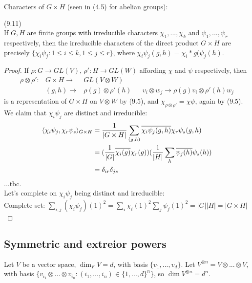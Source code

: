 \documentclass[a4paper]{article}
\begin{document}
Characters of $G \times H$ (seen in (4.5) for abelian groups):\\
\begin{prop} (9.11)\\
If $G,H$ are finite groups with irreducible characters $\chi_1,...,\chi_k$ and $\psi_1,...,\psi_r$ respectively, then the irreducible characters of the direct product $G \times H$ are precisely $\{\chi_i \psi_j:1 \leq i \leq k, 1 \leq j \leq r\}$, where $\chi_i \psi_j (g,h) = \chi_i*g( \psi_j(h)$.
\begin{proof}
If $\rho:G \to GL(V)$, $\rho':H \to GL(W)$ affording $\chi$ and $\psi$ respectively, then
\begin{equation*}
\begin{aligned}
\rho \otimes \rho': &G \times H \to &GL(V \otimes W)\\
&(g,h) \to &\rho(g) \otimes \rho'(h)
& &v_i \otimes w_j \to \rho(g) v_i \otimes \rho'(h) w_j
\end{aligned}
\end{equation*}
is a representation of $G \times H$ on $V \otimes W$ by (9.5), and $\chi_{\rho \otimes \rho'} = \chi\psi$, again by (9.5).\\
We claim that $\chi_i \psi_j$ are distinct and irreducible:
\begin{equation*}
\begin{aligned}
\langle \chi_i \psi_j,\chi_r\psi_s \rangle_{G \times H} &= \frac{1}{|G \times H|} \sum_{(g,h)} \overline{\chi_i\psi_j (g,h)} \chi_r \psi_s (g,h)\\
&= (\frac{1}{|G|} \overline{\chi_i(g)} \chi_r(g)) (\frac{1}{|H|} \sum_h \overline{\psi_j(h)} \psi_s(h))\\
&= \delta_{ir} \delta_{js}
\end{aligned}
\end{equation*}
...tbc.\\
Let's complete on $\chi_i\psi_j$ being distinct and irreducible:\\
Complete set: $\sum_{i,j} (\chi_i\psi_j)(1)^2 = \sum_i \chi_i(1)^2 \sum_j \psi_j(1)^2 = |G| |H| = |G \times H|$
\end{proof}
\end{prop}

\subsection{Symmetric and extreior powers}
Let $V$ be a vector space, $\dim_F V = d$, with basis $\{v_1,...,v_d\}$. Let $V^{\otimes n} = V \otimes ... \otimes V$, with basis $\{v_{i_1} \otimes ... \otimes v_{i_n} : (i_1,...,i_n) \in \{1,...,d\}^n\}$, so $\dim V^{\otimes n} = d^n$.
\end{document}
